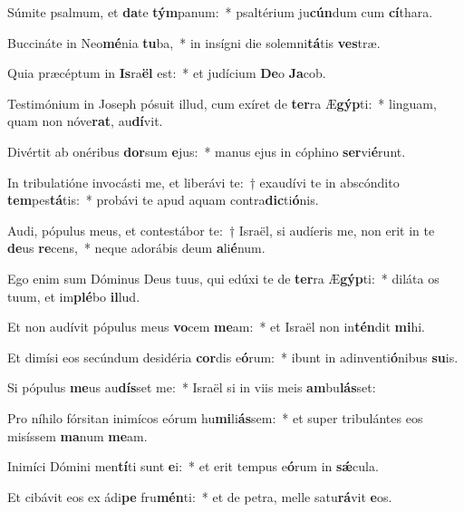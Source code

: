 \item Súmite psalmum, et \textbf{da}te \textbf{tým}panum:~* psaltérium ju\textbf{cún}dum cum \textbf{cí}thara.
\item Buccináte in Neo\textbf{mé}nia \textbf{tu}ba,~* in insígni die solemni\textbf{tá}tis \textbf{ves}træ.
\item Quia præcéptum in \textbf{Is}ra\textbf{ël} est:~* et judícium \textbf{De}o \textbf{Ja}cob.
\item Testimónium in Joseph pósuit illud, cum exíret de \textbf{ter}ra Æ\textbf{gýp}ti:~* linguam, quam non nóve\textbf{rat}, au\textbf{dí}vit.
\item Divértit ab onéribus \textbf{dor}sum \textbf{e}jus:~* manus ejus in cóphino \textbf{ser}vi\textbf{é}runt.
\item In tribulatióne invocásti me, et liberávi te:~† exaudívi te in abscóndito \textbf{tem}pes\textbf{tá}tis:~* probávi te apud aquam contra\textbf{dic}ti\textbf{ó}nis.
\item Audi, pópulus meus, et contestábor te:~† Israël, si audíeris me, non erit in te \textbf{de}us \textbf{re}cens,~* neque adorábis deum \textbf{a}li\textbf{é}num.
\item Ego enim sum Dóminus Deus tuus, qui edúxi te de \textbf{ter}ra Æ\textbf{gýp}ti:~* diláta os tuum, et im\textbf{plé}bo \textbf{il}lud.
\item Et non audívit pópulus meus \textbf{vo}cem \textbf{me}am:~* et Israël non in\textbf{tén}dit \textbf{mi}hi.
\item Et dimísi eos secúndum desidéria \textbf{cor}dis e\textbf{ó}rum:~* ibunt in adinventi\textbf{ó}nibus \textbf{su}is.
\item Si pópulus \textbf{me}us au\textbf{dís}set me:~* Israël si in viis meis \textbf{am}bu\textbf{lás}set:
\item Pro níhilo fórsitan inimícos eórum hu\textbf{mi}li\textbf{ás}sem:~* et super tribulántes eos misíssem \textbf{ma}num \textbf{me}am.
\item Inimíci Dómini men\textbf{tí}ti sunt \textbf{e}i:~* et erit tempus e\textbf{ó}rum in \textbf{sǽ}cula.
\item Et cibávit eos ex ádi\textbf{pe} fru\textbf{mén}ti:~* et de petra, melle satu\textbf{rá}vit \textbf{e}os.
